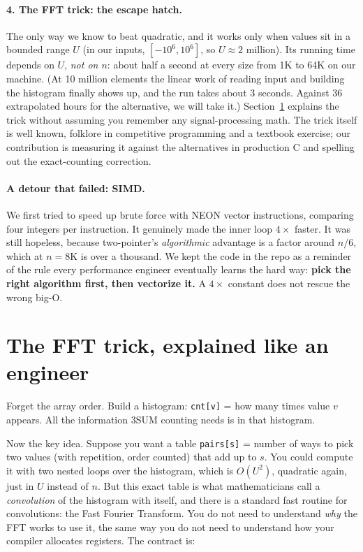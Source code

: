 \documentclass[11pt]{article}
\begin{document}
\paragraph{4. The FFT trick: the escape hatch.}
The only way we know to beat quadratic, and it works only when values sit in a
bounded range $U$ (in our inputs, $[-10^6, 10^6]$, so $U \approx 2$ million). Its
running time depends on $U$, \emph{not on $n$}: about half a second at every size
from 1K to 64K on our machine. (At 10 million elements the linear work of reading
input and building the histogram finally shows up, and the run takes about 3
seconds. Against 36 extrapolated hours for the alternative, we will take it.)
Section~\ref{sec:fft} explains the trick without assuming you remember any
signal-processing math. The trick itself is well known, folklore in competitive
programming and a textbook exercise; our contribution is measuring it against the
alternatives in production C and spelling out the exact-counting correction.

\paragraph{A detour that failed: SIMD.}
We first tried to speed up brute force with NEON vector instructions, comparing
four integers per instruction. It genuinely made the inner loop $4\times$ faster.
It was still hopeless, because two-pointer's \emph{algorithmic} advantage is a
factor around $n/6$, which at $n=8$K is over a thousand. We kept the code in the
repo as a reminder of the rule every performance engineer eventually learns the
hard way: \textbf{pick the right algorithm first, then vectorize it.} A $4\times$
constant does not rescue the wrong big-O.

\section{The FFT trick, explained like an engineer}
\label{sec:fft}

Forget the array order. Build a histogram: \texttt{cnt[v]} = how many times value
$v$ appears. All the information 3SUM counting needs is in that histogram.

Now the key idea. Suppose you want a table \texttt{pairs[s]} = number of ways to
pick two values (with repetition, order counted) that add up to $s$. You could
compute it with two nested loops over the histogram, which is $O(U^2)$, quadratic
again, just in $U$ instead of $n$. But this exact table is what mathematicians
call a \emph{convolution} of the histogram with itself, and there is a standard
fast routine for convolutions: the Fast Fourier Transform. You do not need to
understand \emph{why} the FFT works to use it, the same way you do not need to
understand how your compiler allocates registers. The contract is:
\end{document}
